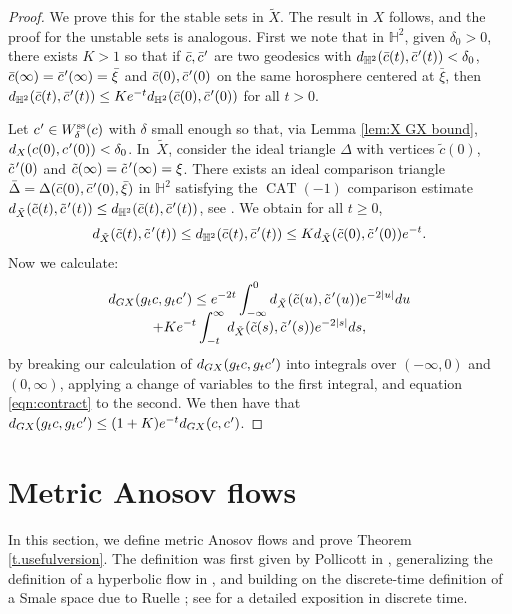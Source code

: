 \documentclass[JEP,XML,SOM,Unicode,NoFloatCountersInSection]{cedram}
\newcommand{\cpr}{c\mkern1mu'}
\newcommand{\bcpr}{\bar c\mkern1mu'}
\newcommand{\tcpr}{\tilde c\mkern2mu'}
\newcommand{\sts}{\mathrm{ss}}
\theoremstyle{definition}
\numberwithin{equation}{section}
\DeclareMathOperator{\CAT}{CAT}
\begin{document}
\begin{proof}
We prove this for the stable sets in $\tilde X$. The result in $X$ follows, and the proof for the unstable sets is analogous. First we note that in $\mathbb{H}^2$, given $\delta_0>0$, there exists $K>1$ so that if $\bar c, \bcpr$ are two geodesics with $d_{\mathbb{H}^2}(\bar c(t), \bcpr(t) ) < \delta_0$, $\bar c(\infty)= \bcpr(\infty) = \bar \xi$ and $\bar c(0), \bcpr(0)$ on the same horosphere centered at $\bar \xi$, then $d_{\mathbb{H}^2}(\bar c(t), \bcpr(t) ) \leq K e^{-t} d_{\mathbb{H}^2}(\bar c(0), \bcpr(0)) $ for all $t>0$.

Let $\cpr \in W^{\sts}_\delta(c)$ with $\delta$ small enough so that, via Lemma \ref{lem:X GX bound}, $d_X( c(0), \cpr(0)) <\delta_0 $. In~$\tilde X$, consider the ideal triangle $\Delta$ with vertices $ \tilde c(0)$, $\tcpr(0)$ and \hbox{$\tilde c(\infty)= \tcpr(\infty)=\xi$}.
There exists an ideal comparison triangle $\bar\Delta= \Delta(\bar c(0), \bcpr(0), \bar\xi)$ in $\mathbb{H}^2$ satisfying the $\CAT(-1)$ comparison estimate $d_{\tilde X}(\tilde c(t), \tcpr(t)) \leq d_{\mathbb{H}^2}(\bar c(t), \bcpr(t))$, see \cite[Prop.\,4.4.13]{das-simmons-urbanski}. We obtain for all $t\geq 0$,
\begin{equation}\label{eqn:contract}
d_{\tilde X}(\tilde c(t), \tcpr(t)) \leq d_{\mathbb{H}^2}(\bar c(t), \bcpr(t)) \leq K d_{\tilde X}(\tilde c(0),\tcpr(0)) e^{-t}.
\end{equation}
Now we calculate:
\begin{multline*}
d_{G X}(g_t c, g_t \cpr) \leq e^{-2t} \int_{-\infty}^0 d_{\tilde X}(\tilde c(u),\tcpr(u)) e^{-2|u|}du\\[-8pt]
+ K e^{-t} \int_{-t}^\infty d_{\tilde X}(\tilde c(s),\tcpr(s)) e^{-2|s|} ds,
\end{multline*}
by breaking our calculation of $d_{G X}(g_t c, g_t \cpr)$ into integrals over $(-\infty,0)$ and $(0,\infty)$, applying a change of variables to the first integral, and equation \eqref{eqn:contract} to the second. We then have that $d_{G X}(g_t c, g_t \cpr) \leq (1+K)e^{-t} d_{G X}(c,\cpr)$.
\end{proof}

\section{Metric Anosov flows}\label{sec:Markov}

In this section, we define metric Anosov flows and prove Theorem \ref{t.usefulversion}. The definition was first given by Pollicott in \cite{pollicott}, generalizing the definition of a hyperbolic flow in \cite{bowen-periodic, bowen-symbolic}, and building on the discrete-time definition of a Smale space due to Ruelle \cite{Ruelle}; see \cite{iP2014} for a detailed exposition in discrete time.
\end{document}

